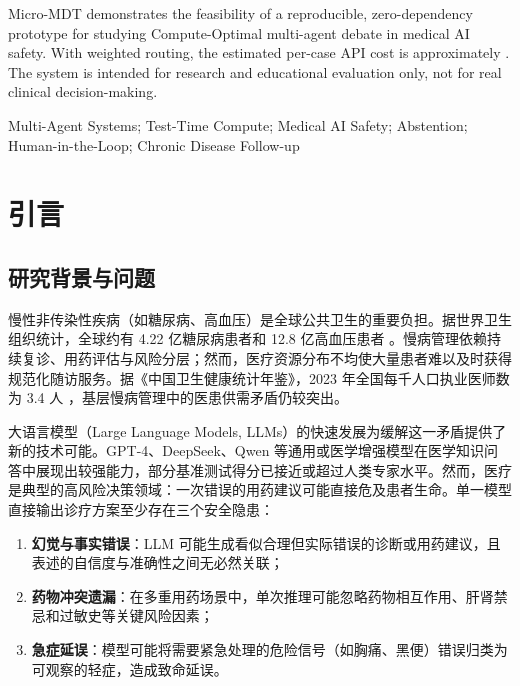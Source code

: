 \documentclass[11pt,a4paper]{ctexart}
\begin{document}
 Micro-MDT demonstrates the feasibility of a reproducible, zero-dependency prototype for studying Compute-Optimal multi-agent debate in medical AI safety. With weighted routing, the estimated per-case API cost is approximately . The system is intended for research and educational evaluation only, not for real clinical decision-making.

\vspace{1em}
 Multi-Agent Systems; Test-Time Compute; Medical AI Safety; Abstention; Human-in-the-Loop; Chronic Disease Follow-up

\newpage
\section{引言}

\subsection{研究背景与问题}

慢性非传染性疾病（如糖尿病、高血压）是全球公共卫生的重要负担。据世界卫生组织统计，全球约有 4.22 亿糖尿病患者和 12.8 亿高血压患者 \cite{world2024diabetes}。慢病管理依赖持续复诊、用药评估与风险分层；然而，医疗资源分布不均使大量患者难以及时获得规范化随访服务。据《中国卫生健康统计年鉴》，2023 年全国每千人口执业医师数为 3.4 人 \cite{china2023health}，基层慢病管理中的医患供需矛盾仍较突出。

大语言模型（Large Language Models, LLMs）的快速发展为缓解这一矛盾提供了新的技术可能。GPT-4、DeepSeek、Qwen 等通用或医学增强模型在医学知识问答中展现出较强能力，部分基准测试得分已接近或超过人类专家水平。然而，医疗是典型的高风险决策领域：一次错误的用药建议可能直接危及患者生命。单一模型直接输出诊疗方案至少存在三个安全隐患：

\begin{enumerate}[label=(\arabic*),leftmargin=2em]
    \item \textbf{幻觉与事实错误}：LLM 可能生成看似合理但实际错误的诊断或用药建议，且表述的自信度与准确性之间无必然关联；
    \item \textbf{药物冲突遗漏}：在多重用药场景中，单次推理可能忽略药物相互作用、肝肾禁忌和过敏史等关键风险因素；
    \item \textbf{急症延误}：模型可能将需要紧急处理的危险信号（如胸痛、黑便）错误归类为可观察的轻症，造成致命延误。
\end{enumerate}
\end{document}
